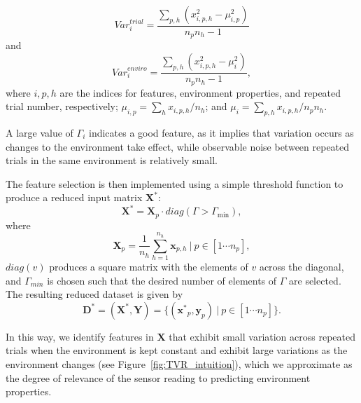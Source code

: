 \begin{equation}
  \mathit{Var}_i^{trial} = \frac{\sum_{p,h}( x_{i,p,h}^2 - \mu_{i,p}^2)}{n_pn_h-1}
\end{equation}
and
\begin{equation}
  \mathit{Var}_i^{enviro} = \frac{\sum_{p,h}( x_{i,p,h}^2 - \mu_{i}^2)}{n_pn_h-1},
\end{equation}
where $i,p,h$ are the indices for features, environment properties, and repeated trial     number,
respectively; $\mu_{i,p} = \sum_{h} x_{i,p,h}/ n_h$; and $\mu_{i} = \sum_{p,h} x_{i,p,h}/  n_pn_h$. 

A large value of $\Gamma_i$ indicates a good feature, as it implies that variation occurs as changes to the environment take effect, while observable noise between repeated trials in the same environment is relatively small.


The feature selection is then implemented using a simple threshold function to produce a reduced input matrix $\mathbf{X}^*$:
   \begin{equation} \mathbf{X}^* = \mathbf{X}_p \cdot diag(\Gamma > \Gamma_{\min}),\end{equation} 
where
\begin{equation}\mathbf{X}_{p} = \frac{1}{n_h}\sum_{h=1}^{n_h}{\mathbf{x}_{p,h}}~\lvert~ p\in[1\cdots n_p],\end{equation} 
$diag(v)$ produces a square matrix with the elements of $v$ across the diagonal, and $\Gamma_{min}$ is chosen such that the desired number of elements of $\Gamma$ are selected.
The resulting reduced dataset is given by
\begin{equation}   \mathbf{D}^* = (\mathbf{X}^*,\mathbf{\mathbf{Y}}) = \{ (\mathbf{x^*}_{p},\mathbf{y}_{p})~\lvert~ p\in[1\cdots n_p] \}. \end{equation} 

In this way, we identify features in $\mathbf{X}$ that exhibit small variation across repeated trials when the environment is kept constant and exhibit large variations as the environment changes (see Figure~\ref{fig:TVR_intuition}), which we approximate as the degree of relevance of the sensor reading to predicting environment properties.

